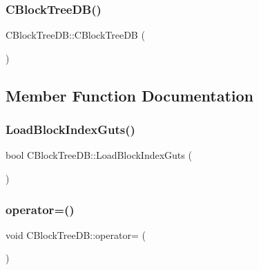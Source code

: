 \subsubsection{\texorpdfstring{C\+Block\+Tree\+D\+B()}{CBlockTreeDB()}\hspace{0.1cm}{\footnotesize\ttfamily [2/2]}}
{\footnotesize\ttfamily C\+Block\+Tree\+D\+B\+::\+C\+Block\+Tree\+DB (\begin{DoxyParamCaption}\item[{const \mbox{\hyperlink{class_c_block_tree_d_b}{C\+Block\+Tree\+DB}} \&}]{ }\end{DoxyParamCaption})\hspace{0.3cm}{\ttfamily [private]}}



\subsection{Member Function Documentation}
\mbox{\label{class_c_block_tree_d_b_a12be19bb1d7253eeb40e1aa88b032346}} 
\subsubsection{\texorpdfstring{Load\+Block\+Index\+Guts()}{LoadBlockIndexGuts()}}
{\footnotesize\ttfamily bool C\+Block\+Tree\+D\+B\+::\+Load\+Block\+Index\+Guts (\begin{DoxyParamCaption}{ }\end{DoxyParamCaption})}

\mbox{\label{class_c_block_tree_d_b_a93fa0b87d518a1142f3fbfe65ab07cd2}} 
\subsubsection{\texorpdfstring{operator=()}{operator=()}}
{\footnotesize\ttfamily void C\+Block\+Tree\+D\+B\+::operator= (\begin{DoxyParamCaption}\item[{const \mbox{\hyperlink{class_c_block_tree_d_b}{C\+Block\+Tree\+DB}} \&}]{ }\end{DoxyParamCaption})\hspace{0.3cm}{\ttfamily [private]}}

